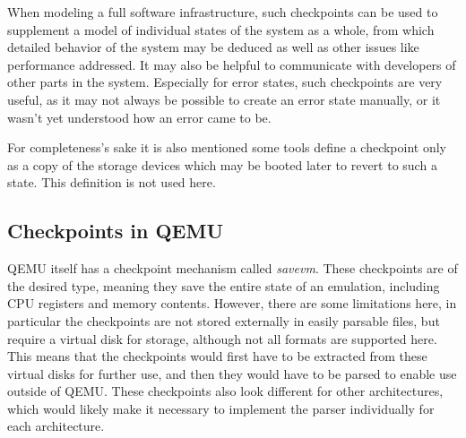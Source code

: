 When modeling a full software infrastructure,
such checkpoints can be used to supplement a model of individual states of the system as a whole,
from which detailed behavior of the system may be deduced
as well as other issues like performance addressed.
It may also be helpful to communicate with developers of other parts in the system.
Especially for error states, such checkpoints are very useful,
as it may not always be possible to create an error state manually,
or it wasn't yet understood how an error came to be.

For completeness's sake it is also mentioned some tools define a checkpoint only as a copy of the storage devices
which may be booted later to revert to such a state.
This definition is not used here.

\subsection{Checkpoints in QEMU}
QEMU itself has a checkpoint mechanism called \emph{savevm}.
These checkpoints are of the desired type, meaning they save the entire state of an emulation,
including CPU registers and memory contents.
However, there are some limitations here, in particular the checkpoints are not stored externally in easily parsable files,
but require a virtual disk for storage, although not all formats are supported here.
This means that the checkpoints would first have to be extracted from these virtual disks for further use,
and then they would have to be parsed to enable use outside of QEMU.
These checkpoints also look different for other architectures, which would likely make it necessary
to implement the parser individually for each architecture.
